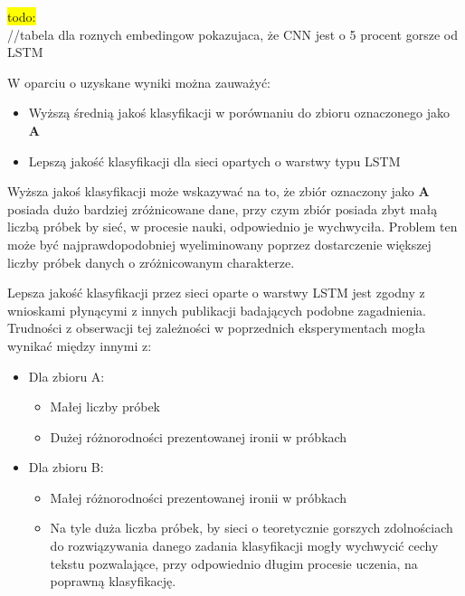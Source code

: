 \colorbox{yellow}{todo:}\\ 
//tabela dla roznych embedingow pokazujaca, że CNN jest o 5 procent gorsze od LSTM 

W oparciu o uzyskane wyniki można zauważyć: 

\begin{itemize}
    \item Wyższą średnią jakoś klasyfikacji w porównaniu do zbioru oznaczonego jako \textbf{A}
    \item Lepszą jakość klasyfikacji dla sieci opartych o warstwy typu LSTM
\end{itemize}
 

Wyższa jakoś klasyfikacji może wskazywać na to, że zbiór oznaczony jako \textbf{A} posiada dużo bardziej zróżnicowane dane, przy czym zbiór posiada zbyt małą liczbą próbek by sieć, w procesie nauki, odpowiednio je wychwyciła. Problem ten może być najprawdopodobniej wyeliminowany poprzez dostarczenie większej liczby próbek danych o zróżnicowanym charakterze. 

Lepsza jakość klasyfikacji przez sieci oparte o warstwy LSTM jest zgodny z wnioskami płynącymi z innych publikacji badających podobne zagadnienia. Trudności z obserwacji tej zależności w poprzednich eksperymentach mogła wynikać między innymi z: 


\begin{itemize}

    \item Dla zbioru A: 
    \begin{itemize}
        \item Małej liczby próbek 
        \item Dużej różnorodności prezentowanej ironii w próbkach
    \end{itemize}        

    \item Dla zbioru B: 
    \begin{itemize}
        \item Małej różnorodności prezentowanej ironii w próbkach 
        \item Na tyle duża liczba próbek, by sieci o teoretycznie gorszych zdolnościach do rozwiązywania danego zadania klasyfikacji mogły wychwycić cechy tekstu pozwalające, przy odpowiednio długim procesie uczenia, na poprawną klasyfikację.
    \end{itemize} 

\end{itemize}


 



 